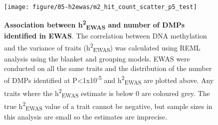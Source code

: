 \documentclass[11pt,twoside]{bristolthesis}
\begin{document}
\begin{figure}

{\centering \texttt{[image: figure/05-h2ewas/m2\_hit\_count\_scatter\_p5\_test]} 

}

\caption[Association between h\textsuperscript{2}\textsubscript{EWAS} and number of DMPs identified in EWAS]{\textbf{Association between h\textsuperscript{2}\textsubscript{EWAS} and number of DMPs identified in EWAS}. The correlation between DNA methylation and the variance of traits (h\textsuperscript{2}\textsubscript{EWAS}) was calculated using REML analysis using the blanket and grouping models. EWAS were conducted on all the same traits and the distribution of the number of DMPs identified at P\textless1x10\textsuperscript{-5} and h\textsuperscript{2}\textsubscript{EWAS} are plotted above. Any traits where the h\textsuperscript{2}\textsubscript{EWAS} estimate is below 0 are coloured grey. The true h\textsuperscript{2}\textsubscript{EWAS} value of a trait cannot be negative, but sample sizes in this analysis are small so the estimates are imprecise.}\label{fig:dmps-and-h2ewas}
\end{figure}
\begin{table}[H]

\caption{\label{tab:model-testing-tab}Summary of how well models fit to test the association between $h^2_{EWAS}$ and the number of differentially methylated positions identified across 400 traits at P < 1x10$^{-5}$.}
\centering
{}
\end{table}
\pagebreak
\end{document}
